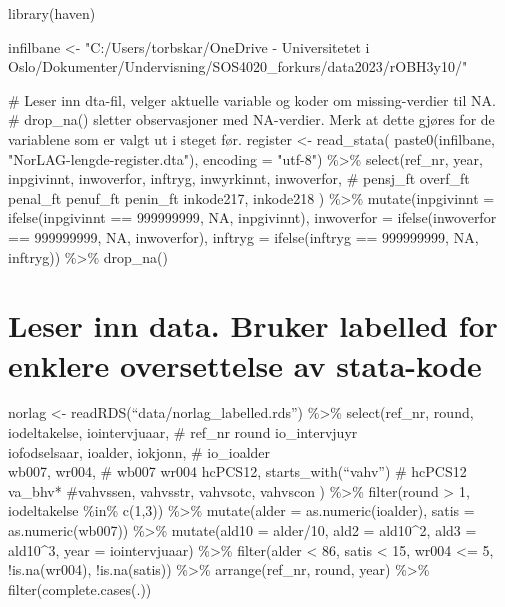 \documentclass[
  norsk,
  letterpaper,
  DIV=11,
  numbers=noendperiod]{scrreprt}
\newenvironment{Shaded}{\begin{snugshade}}{\end{snugshade}}
\newcommand{\AttributeTok}[1]{\textcolor[rgb]{0.40,0.45,0.13}{#1}}
\newcommand{\CommentTok}[1]{\textcolor[rgb]{0.37,0.37,0.37}{#1}}
\newcommand{\ConstantTok}[1]{\textcolor[rgb]{0.56,0.35,0.01}{#1}}
\newcommand{\DecValTok}[1]{\textcolor[rgb]{0.68,0.00,0.00}{#1}}
\newcommand{\FunctionTok}[1]{\textcolor[rgb]{0.28,0.35,0.67}{#1}}
\newcommand{\NormalTok}[1]{\textcolor[rgb]{0.00,0.23,0.31}{#1}}
\newcommand{\OtherTok}[1]{\textcolor[rgb]{0.00,0.23,0.31}{#1}}
\newcommand{\SpecialCharTok}[1]{\textcolor[rgb]{0.37,0.37,0.37}{#1}}
\newcommand{\StringTok}[1]{\textcolor[rgb]{0.13,0.47,0.30}{#1}}
\theoremstyle{definition}
\theoremstyle{remark}
\begin{document}
\begin{Shaded}
\begin{Highlighting}[]
\FunctionTok{library}\NormalTok{(haven)}


\NormalTok{infilbane }\OtherTok{\textless{}{-}} \StringTok{"C:/Users/torbskar/OneDrive {-} Universitetet i Oslo/Dokumenter/Undervisning/SOS4020\_forkurs/data2023/rOBH3y10/"}

\CommentTok{\# Leser inn dta{-}fil, velger aktuelle variable og koder om missing{-}verdier til NA. }
\CommentTok{\# drop\_na() sletter observasjoner med NA{-}verdier. Merk at dette gjøres for de variablene som er valgt ut i steget før. }
\NormalTok{register }\OtherTok{\textless{}{-}} \FunctionTok{read\_stata}\NormalTok{( }\FunctionTok{paste0}\NormalTok{(infilbane, }\StringTok{"NorLAG{-}lengde{-}register.dta"}\NormalTok{), }\AttributeTok{encoding =} \StringTok{"utf{-}8"}\NormalTok{) }\SpecialCharTok{\%\textgreater{}\%} 
  \FunctionTok{select}\NormalTok{(ref\_nr, year, }
\NormalTok{         inpgivinnt, inwoverfor, inftryg, inwyrkinnt, inwoverfor,    }\CommentTok{\# pensj\_ft overf\_ft penal\_ft penuf\_ft penin\_ft }
\NormalTok{         inkode217, inkode218 ) }\SpecialCharTok{\%\textgreater{}\%} 
  \FunctionTok{mutate}\NormalTok{(}\AttributeTok{inpgivinnt =} \FunctionTok{ifelse}\NormalTok{(inpgivinnt }\SpecialCharTok{==} \DecValTok{999999999}\NormalTok{, }\ConstantTok{NA}\NormalTok{, inpgivinnt),}
         \AttributeTok{inwoverfor =} \FunctionTok{ifelse}\NormalTok{(inwoverfor }\SpecialCharTok{==} \DecValTok{999999999}\NormalTok{, }\ConstantTok{NA}\NormalTok{, inwoverfor),}
         \AttributeTok{inftryg =} \FunctionTok{ifelse}\NormalTok{(inftryg }\SpecialCharTok{==} \DecValTok{999999999}\NormalTok{, }\ConstantTok{NA}\NormalTok{, inftryg)) }\SpecialCharTok{\%\textgreater{}\%} 
  \FunctionTok{drop\_na}\NormalTok{()}
\end{Highlighting}
\end{Shaded}

\chapter{Leser inn data. Bruker labelled for enklere oversettelse av
stata-kode}\label{leser-inn-data.-bruker-labelled-for-enklere-oversettelse-av-stata-kode}

norlag \textless- readRDS(``data/norlag\_labelled.rds'')
\%\textgreater\% select(ref\_nr, round, iodeltakelse, iointervjuaar, \#
ref\_nr round io\_intervjuyr\\
iofodselsaar, ioalder, iokjonn, \# io\_ioalder\\
wb007, wr004, \# wb007 wr004 hcPCS12, starts\_with(``vahv'') \# hcPCS12
va\_bhv* \#vahvssen, vahvsstr, vahvsotc, vahvscon ) \%\textgreater\%
filter(round \textgreater{} 1, iodeltakelse \%in\% c(1,3))
\%\textgreater\% mutate(alder = as.numeric(ioalder), satis =
as.numeric(wb007)) \%\textgreater\% mutate(ald10 = alder/10, ald2 =
ald10\^{}2, ald3 = ald10\^{}3, year = iointervjuaar) \%\textgreater\%
filter(alder \textless{} 86, satis \textless{} 15, wr004 \textless= 5,
!is.na(wr004), !is.na(satis)) \%\textgreater\% arrange(ref\_nr, round,
year) \%\textgreater\% filter(complete.cases(.))
\end{document}
